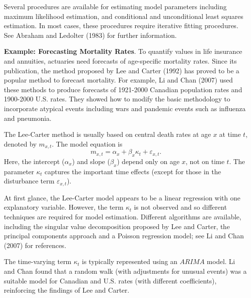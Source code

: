 Several procedures are available for estimating model parameters including
maximum likelihood estimation, and conditional and unconditional least
squares estimation. In most cases, these procedures require iterative
fitting procedures. See Abraham and Ledolter (1983) for further information.

\linejed


\textbf{Example: Forecasting Mortality Rates}. To quantify values in life insurance and
annuities, actuaries need forecasts of age-specific mortality rates.
Since its publication, the method proposed by Lee and Carter (1992)
has proved to be a popular method to forecast mortality. For
example, Li and Chan (2007) used these methods to produce forecasts
of 1921-2000 Canadian population rates and 1900-2000 U.S. rates.
They showed how to modify the basic methodology to incorporate
atypical events including wars and pandemic events such as influenza
and pneumonia.

The Lee-Carter method is usually based on central death rates at age
$x$ at time $t$, denoted by $m_{x,t}$. The model equation is
\begin{equation}\label{E8:LeeCarter}
m_{x,t} = \alpha_x + \beta_x \kappa_t + \varepsilon_{x,t} .
\end{equation}
Here, the intercept ($\alpha_x$) and slope ($\beta_x$) depend only
on age $x$, not on time $t$. The parameter $\kappa_t$ captures the
important time effects (except for those in the disturbance term
$\varepsilon_{x,t}$).

At first glance, the Lee-Carter model appears to be a linear
regression with one explanatory variable. However, the term
$\kappa_t$ is not observed and so different techniques are required
for model estimation. Different algorithms are available, including
the singular value decomposition proposed by Lee and Carter, the
principal components approach and a Poisson regression model; see Li
and Chan (2007) for references.

The time-varying term $\kappa_t$ is typically represented using an
$ARIMA$ model. Li and Chan found that a random walk (with
adjustments for unusual events) was a suitable model for Canadian
and U.S. rates (with different coefficients), reinforcing the
findings of Lee and Carter.



\linejed \bigskip



